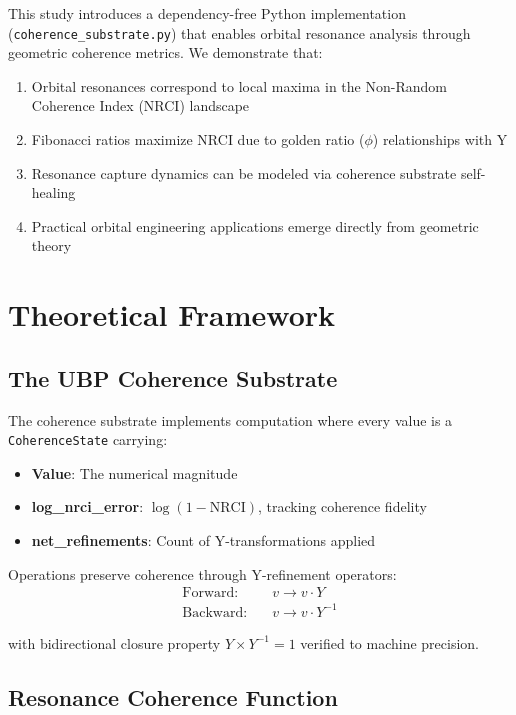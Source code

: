 \documentclass[12pt,a4paper]{article}
\begin{document}
This study introduces a dependency-free Python implementation (\texttt{coherence\_substrate.py}) that enables orbital resonance analysis through geometric coherence metrics. We demonstrate that:

\begin{enumerate}
\item Orbital resonances correspond to local maxima in the Non-Random Coherence Index (NRCI) landscape
\item Fibonacci ratios maximize NRCI due to golden ratio ($\phi$) relationships with Y
\item Resonance capture dynamics can be modeled via coherence substrate self-healing
\item Practical orbital engineering applications emerge directly from geometric theory
\end{enumerate}

\section{Theoretical Framework}

\subsection{The UBP Coherence Substrate}

The coherence substrate implements computation where every value is a \texttt{CoherenceState} carrying:
\begin{itemize}
\item \textbf{Value}: The numerical magnitude
\item \textbf{log\_nrci\_error}: $\log(1 - \text{NRCI})$, tracking coherence fidelity
\item \textbf{net\_refinements}: Count of Y-transformations applied
\end{itemize}

Operations preserve coherence through Y-refinement operators:
\begin{align}
\text{Forward:} \quad & v \rightarrow v \cdot Y \\
\text{Backward:} \quad & v \rightarrow v \cdot Y^{-1}
\end{align}

with bidirectional closure property $Y \times Y^{-1} = 1$ verified to machine precision.

\subsection{Resonance Coherence Function}
\end{document}
